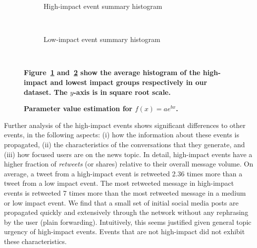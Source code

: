 \documentclass[10pt,letterpaper]{article}
\begin{document}
\begin{figure}[h]
  \centering
  \begin{subfigure}[b]{\textwidth}
    \caption{High-impact event summary histogram %
    }
    \label{fig:highest}
  \end{subfigure}%

  ~%
  \begin{subfigure}[b]{\textwidth}
    \caption{Low-impact event summary histogram %
    }
    \label{fig:low}
  \end{subfigure}%
  ~ %

  \caption{\textbf{Figure~\ref{fig:highest} and~\ref{fig:low} show the average
    histogram of the high-impact and lowest impact groups respectively in our dataset. The $y$-axis is in square root
      scale.
    }}\label{fig:histograms}
\end{figure}

\begin{figure}[h]
  \caption{\textbf{Parameter value estimation for $f(x)=ae^{bx}$.}}
  \label{fig:param_est}
\end{figure}


Further analysis of the high-impact events shows significant
differences to other events, in the following aspects: (i) how the
information about these events is propagated, (ii) the characteristics
of the conversations that they generate, and (iii) how focused users
are on the news topic. In detail, high-impact events have a higher
fraction of {\em retweets} (or shares) relative to their overall
message volume. On average, a tweet from a high-impact event is
retweeted 2.36 times more than a tweet from a low impact event. The
most retweeted message in high-impact events is retweeted 7 times more
than the most retweeted message in a medium or low impact event. We
find that a small set of initial social media posts are propagated
quickly and extensively through the network without any rephrasing by
the user (plain forwarding). Intuitively, this seems justified given
general topic urgency of high-impact events. Events that are not
high-impact did not exhibit these characteristics.
\end{document}
